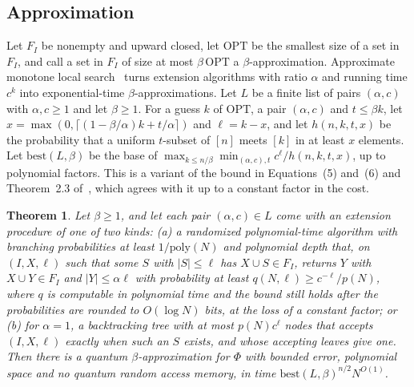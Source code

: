 \documentclass[11pt]{article}
\newtheorem{theorem}{Theorem}[section]
\theoremstyle{remark}
\newcommand{\poly}{\mathrm{poly}}
\begin{document}
\subsection{Approximation}\label{sec:amls}

Let $F_I$ be nonempty and upward closed, let $\mathrm{OPT}$ be the smallest size of a set in $F_I$, and call a set in $F_I$ of size at most $\beta\,\mathrm{OPT}$ a $\beta$-approximation. Approximate monotone local search~\cite{EKMNS22,EKMNS24} turns extension algorithms with ratio $\alpha$ and running time $c^k$ into exponential-time $\beta$-approximations. Let $L$ be a finite list of pairs $(\alpha, c)$ with $\alpha, c \ge 1$ and let $\beta \ge 1$. For a guess $k$ of $\mathrm{OPT}$, a pair $(\alpha, c)$ and $t \le \beta k$, let $x = \max(0, \lceil (1 - \beta/\alpha)k + t/\alpha \rceil)$ and $\ell = k - x$, and let $h(n,k,t,x)$ be the probability that a uniform $t$-subset of $[n]$ meets $[k]$ in at least $x$ elements. Let $\mathrm{best}(L, \beta)$ be the base of $\max_{k \le n/\beta} \min_{(\alpha,c),t} c^\ell / h(n,k,t,x)$, up to polynomial factors. This is a variant of the bound in Equations~(5) and~(6) and Theorem~2.3 of~\cite{EKMNS24}, which agrees with it up to a constant factor in the cost.

\begin{theorem}\label{thm:amls}
Let $\beta \ge 1$, and let each pair $(\alpha, c) \in L$ come with an extension procedure of one of two kinds: (a) a randomized polynomial-time algorithm with branching probabilities at least $1/\poly(N)$ and polynomial depth that, on $(I, X, \ell)$ such that some $S$ with $|S| \le \ell$ has $X \cup S \in F_I$, returns $Y$ with $X \cup Y \in F_I$ and $|Y| \le \alpha\ell$ with probability at least $q(N, \ell) \ge c^{-\ell}/p(N)$, where $q$ is computable in polynomial time and the bound still holds after the probabilities are rounded to $O(\log N)$ bits, at the loss of a constant factor; or (b) for $\alpha = 1$, a backtracking tree with at most $p(N)c^\ell$ nodes that accepts $(I, X, \ell)$ exactly when such an $S$ exists, and whose accepting leaves give one. Then there is a quantum $\beta$-approximation for $\Phi$ with bounded error, polynomial space and no quantum random access memory, in time $\mathrm{best}(L,\beta)^{n/2} N^{O(1)}$.
\end{theorem}
\end{document}
